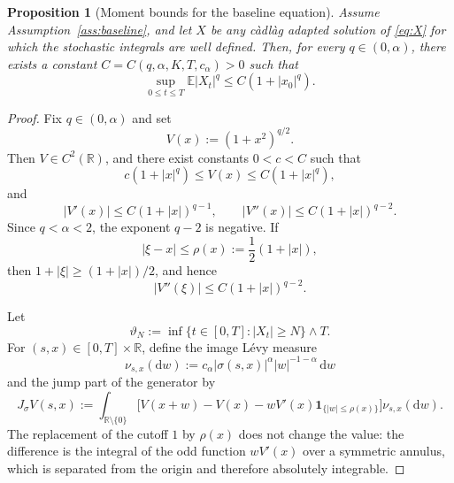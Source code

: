 \documentclass[10pt,a4paper]{amsart}
\newtheorem{proposition}[theorem]{Proposition}
\newcommand{\R}{\mathbb{R}}
\newcommand{\E}{\mathbb{E}}
\newcommand{\1}{\mathbf{1}}
\newcommand{\md}{\mathrm{d}}
\begin{document}
\begin{proposition}[Moment bounds for the baseline equation]\label{prop:baseline-moments}
Assume Assumption~\ref{ass:baseline}, and let $X$ be any c\`adl\`ag adapted solution of \eqref{eq:X} for which the stochastic integrals are well defined. Then, for every $q\in(0,\alpha)$, there exists a constant $C=C(q,\alpha,K,T,c_\alpha)>0$ such that
\[
  \sup_{0\le t\le T}\E |X_t|^q\le C(1+|x_0|^q).
\]
\end{proposition}

\begin{proof}
Fix $q\in(0,\alpha)$ and set
\[
  V(x):=(1+x^2)^{q/2}.
\]
Then $V\in C^2(\R)$, and there exist constants $0<c<C$ such that
\[
  c(1+|x|^q)\le V(x)\le C(1+|x|^q),
\]
and
\begin{equation}\label{eq:V-derivatives}
  |V'(x)|\le C(1+|x|)^{q-1},\qquad
  |V''(x)|\le C(1+|x|)^{q-2}.
\end{equation}
Since $q<\alpha<2$, the exponent $q-2$ is negative. If
\[
  |\xi-x|\le \rho(x):=\frac12(1+|x|),
\]
then $1+|\xi|\ge(1+|x|)/2$, and hence
\begin{equation}\label{eq:V-local-second}
  |V''(\xi)|\le C(1+|x|)^{q-2}.
\end{equation}

Let
\[
  \vartheta_N:=\inf\{t\in[0,T]:|X_t|\ge N\}\wedge T.
\]
For $(s,x)\in[0,T]\times\R$, define the image L\'evy measure
\[
  \nu_{s,x}(\md w):=c_\alpha|\sigma(s,x)|^\alpha |w|^{-1-\alpha}\,\md w
\]
and the jump part of the generator by
\begin{equation}\label{eq:Jsigma-definition}
J_\sigma V(s,x):=
\int_{\R\setminus\{0\}}
\bigl[V(x+w)-V(x)-wV'(x)\1_{\{|w|\le\rho(x)\}}\bigr]\nu_{s,x}(\md w).
\end{equation}
The replacement of the cutoff $1$ by $\rho(x)$ does not change the value: the difference is the integral of the odd function $wV'(x)$ over a symmetric annulus, which is separated from the origin and therefore absolutely integrable.


\end{proof}
\end{document}
